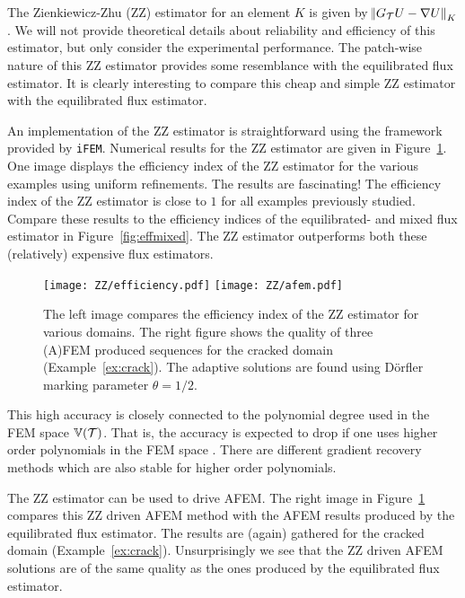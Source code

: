 \documentclass[thesis.tex]{subfiles}
\begin{document}
The Zienkiewicz-Zhu (ZZ) estimator for an element $K$ is given by $\norm{G_{\mathcal{T}} U - \nabla U}_K$. We will
not provide theoretical details about reliability and efficiency of this estimator, but only consider
the experimental performance. The patch-wise nature of this ZZ estimator provides
some resemblance with the equilibrated flux estimator.
It is clearly interesting to compare this cheap and simple ZZ estimator with the equilibrated flux estimator.

An implementation of the ZZ estimator is straightforward using the framework provided by \texttt{iFEM}. 
Numerical results for the ZZ estimator are given in Figure~\ref{fig:ZZ}.
One image displays the efficiency index of the ZZ estimator for the various examples using uniform refinements.
The results are fascinating! The efficiency index of the ZZ estimator is close to $1$ for all examples previously
studied. Compare these results to the efficiency indices of the equilibrated- and mixed flux estimator in Figure~\ref{fig:effmixed}.
The ZZ estimator outperforms both these (relatively) expensive flux estimators. 
\begin{figure}
  \centering
  \texttt{[image: ZZ/efficiency.pdf]}
  \texttt{[image: ZZ/afem.pdf]}
  \caption{
    The left image compares the efficiency index of the ZZ estimator for various domains.
    The right figure shows the quality of three (A)FEM produced sequences for the cracked domain (Example~\ref{ex:crack}). The adaptive solutions are found using D\"orfler marking parameter $\theta = 1/2$.
  }
  \label{fig:ZZ}
\end{figure}

This high accuracy is closely
connected to the polynomial degree used in the FEM space $\mathbb{V}(\mathcal{T})$. That is, the accuracy
is expected to drop if one uses higher order polynomials in the FEM space \cite{bartels2002each}.
There are different gradient recovery methods which are also stable for higher order polynomials.

The ZZ estimator can be used to drive AFEM. The right image in Figure~\ref{fig:ZZ} compares this ZZ driven AFEM method
with the AFEM results produced by the equilibrated flux estimator. The results are (again) gathered for the cracked domain 
(Example~\ref{ex:crack}). Unsurprisingly we see that the ZZ driven AFEM solutions are of the same quality as the ones produced by the
equilibrated flux estimator. 
\end{document}
